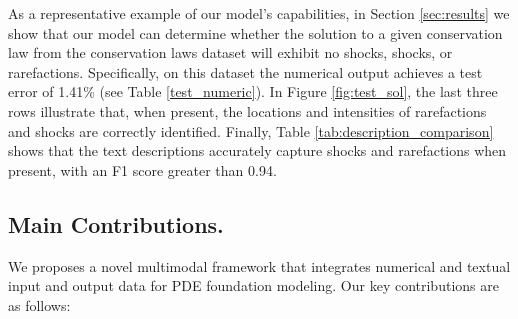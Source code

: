\documentclass{article}
\begin{document}
As a representative example of our model's capabilities, in Section \ref{sec:results} we show that our model can determine whether the solution to a given conservation law from the conservation laws dataset will exhibit no shocks, shocks, or rarefactions. Specifically, on this dataset the numerical output achieves a test error of 1.41\% (see Table \ref{test_numeric}). In Figure \ref{fig:test_sol}, the last three rows illustrate that, when present, the locations and intensities of rarefactions and shocks are correctly identified. Finally, Table \ref{tab:description_comparison} shows that the text descriptions accurately capture shocks and rarefactions when present, with an F1 score greater than 0.94.






\subsection{Main Contributions.} We proposes a novel multimodal framework that integrates numerical and textual input and output data for PDE foundation modeling. Our key contributions are as follows:
\end{document}
